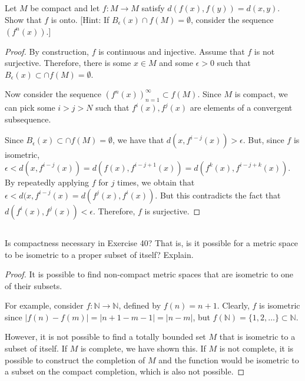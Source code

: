 
\subsection{} Let $M$ be compact and let $f:M \rightarrow M$ satisfy $d(f(x), f(y)) = d(x , y)$. Show that $f$ is onto. [Hint: If $B_\epsilon(x) \cap f(M) = \emptyset$, consider the sequence $(f^n(x))$.]

\begin{proof}
By construction, $f$ is continuous and injective. Assume that $f$ is not surjective. Therefore, there is some $x \in M$ and some $\epsilon > 0$ such that $B_\epsilon(x) \subset \cap f(M) = \emptyset$. 

Now consider the sequence $(f^n(x))_{n=1}^\infty \subset f(M)$. Since $M$ is compact, we can pick some $i>j>N$ such that $f^i(x), f^j(x)$ are elements of a convergent subsequence.

Since $B_\epsilon(x) \subset \cap f(M) = \emptyset$, we have that $d(x,f^{i-j}(x)) > \epsilon$. But, since $f$ is isometric, $\epsilon < d(x,f^{i-j}(x)) = d(f(x), f^{i-j+1}(x)) = d(f^k(x), f^{i-j+k}(x))$. By repeatedly applying $f$ for $j$ times, we obtain that $\epsilon < d(x,f^{i-j}(x) = d(f^j(x), f^i(x))$. But this contradicts the fact that $d(f^i(x), f^j(x)) < \epsilon$. Therefore, $f$ is surjective.


\end{proof}

\subsection{} Is compactness necessary in Exercise 40? That is, is it possible for  a metric space to be isometric to a proper subset of itself? Explain.

\begin{proof}
It is possible to find non-compact metric spaces that are isometric to one of their subsets. 

For example, consider $f: \mathbb{N} \rightarrow \mathbb{N}$, defined by $f(n) = n+1$. Clearly, $f$ is isometric since $|f(n) - f(m)| = |n+1 - m - 1| = |n - m|$, but $f(\mathbb{N}) = \{1, 2, \dots\} \subset \mathbb{N}$.

However, it is not possible to find a totally bounded set $M$ that is isometric to a subset of itself. If $M$ is complete, we have shown this. If $M$ is not complete, it is possible to construct the completion of $M$ and the function would be isometric to a subset on the compact completion, which is also not possible.
\end{proof}

